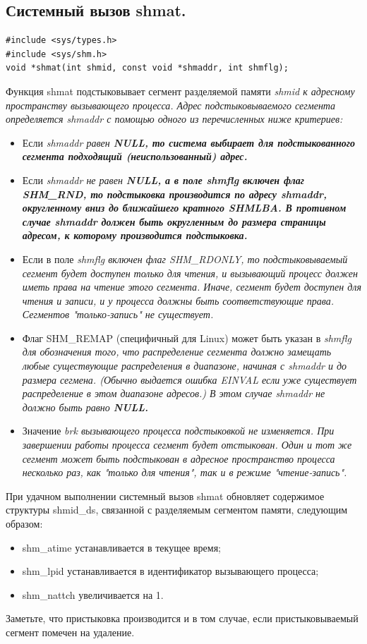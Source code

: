 \documentclass[a4paper]{article}
\begin{document}
\subsection{\Large Системный вызов shmat.}
\begin{verbatim}
#include <sys/types.h>
#include <sys/shm.h>
void *shmat(int shmid, const void *shmaddr, int shmflg);
\end{verbatim}
Функция shmat подстыковывает сегмент разделяемой памяти \sl shmid \rm к адресному пространству вызывающего процесса. Адрес подстыковываемого сегмента определяется \sl shmaddr \rm с помощью одного из перечисленных ниже критериев:
\begin{itemize}
  \item Если \sl shmaddr \rm равен \bf NULL, \rm то система выбирает для подстыкованного сегмента подходящий (неиспользованный) адрес.
  \item Если \sl shmaddr \rm не равен \bf NULL, \rm а в поле \sl shmflg \rm включен флаг SHM\_RND, то подстыковка производится по адресу \sl shmaddr, \rm округленному вниз до ближайшего кратного SHMLBA. В противном случае \sl shmaddr \rm должен быть округленным до размера страницы адресом, к которому производится подстыковка.
  \item Если в поле \sl shmflg включен флаг SHM\_RDONLY, то подстыковываемый сегмент будет доступен только для чтения, и вызывающий процесс должен иметь права на чтение этого сегмента. Иначе, сегмент будет доступен для чтения и записи, и у процесса должны быть соответствующие права. Сегментов "только-запись" не существует.
  \item Флаг SHM\_REMAP (специфичный для Linux) может быть указан в \sl shmflg \rm для обозначения того, что распределение сегмента должно замещать любые существующие распределения в диапазоне, начиная с \sl shmaddr \rm и до размера сегмена. (Обычно выдается ошибка EINVAL если уже существует распределение в этом диапазоне адресов.) В этом случае \sl shmaddr \rm не должно быть равно \bf NULL.
  \item \rm Значение \sl brk \rm вызывающего процесса подстыковкой не изменяется. При завершении работы процесса сегмент будет отстыкован. Один и тот же сегмент может быть подстыкован в адресное пространство процесса несколько раз, как "только для чтения", так и в режиме "чтение-запись".
\end{itemize}
При удачном выполнении системный вызов shmat обновляет содержимое структуры shmid\_ds, связанной с разделяемым сегментом памяти, следующим образом:
\begin{itemize}
  \item shm\_atime устанавливается в текущее время;
  \item shm\_lpid устанавливается в идентификатор вызывающего процесса;
  \item shm\_nattch увеличивается на 1.
\end{itemize}
Заметьте, что пристыковка производится и в том случае, если пристыковываемый сегмент помечен на удаление.
\end{document}
